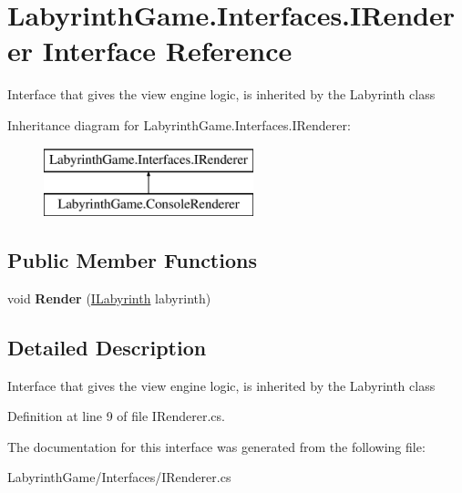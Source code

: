 \hypertarget{interface_labyrinth_game_1_1_interfaces_1_1_i_renderer}{\section{Labyrinth\+Game.\+Interfaces.\+I\+Renderer Interface Reference}
\label{interface_labyrinth_game_1_1_interfaces_1_1_i_renderer}
}


Interface that gives the view engine logic, is inherited by the Labyrinth class  


Inheritance diagram for Labyrinth\+Game.\+Interfaces.\+I\+Renderer\+:\begin{figure}[H]
\begin{center}
\leavevmode
\includegraphics[height=2.000000cm]{interface_labyrinth_game_1_1_interfaces_1_1_i_renderer}
\end{center}
\end{figure}
\subsection*{Public Member Functions}
\begin{DoxyCompactItemize}
\item 
\hypertarget{interface_labyrinth_game_1_1_interfaces_1_1_i_renderer_a6683ba42661c769819043f3c48934e55}{void {\bfseries Render} (\hyperlink{interface_labyrinth_game_1_1_interfaces_1_1_i_labyrinth}{I\+Labyrinth} labyrinth)}\label{interface_labyrinth_game_1_1_interfaces_1_1_i_renderer_a6683ba42661c769819043f3c48934e55}

\end{DoxyCompactItemize}


\subsection{Detailed Description}
Interface that gives the view engine logic, is inherited by the Labyrinth class 



Definition at line 9 of file I\+Renderer.\+cs.



The documentation for this interface was generated from the following file\+:\begin{DoxyCompactItemize}
\item 
Labyrinth\+Game/\+Interfaces/I\+Renderer.\+cs\end{DoxyCompactItemize}
